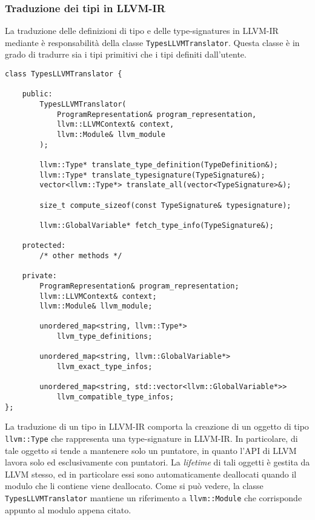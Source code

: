 \subsubsection{Traduzione dei tipi in LLVM-IR}
La traduzione delle definizioni di tipo e delle type-signatures in LLVM-IR mediante è responsabilità della classe 
\texttt{TypesLLVMTranslator}. Questa classe è in grado di tradurre sia i tipi primitivi che i tipi definiti dall'utente.

\vspace{0.5cm}
\begin{lstlisting}[frame=single]
class TypesLLVMTranslator {

    public:
        TypesLLVMTranslator(
            ProgramRepresentation& program_representation, 
            llvm::LLVMContext& context,
            llvm::Module& llvm_module
        );

        llvm::Type* translate_type_definition(TypeDefinition&);
        llvm::Type* translate_typesignature(TypeSignature&);
        vector<llvm::Type*> translate_all(vector<TypeSignature>&);

        size_t compute_sizeof(const TypeSignature& typesignature);

        llvm::GlobalVariable* fetch_type_info(TypeSignature&);

    protected:
        /* other methods */

    private:
        ProgramRepresentation& program_representation;
        llvm::LLVMContext& context;
        llvm::Module& llvm_module;

        unordered_map<string, llvm::Type*> 
            llvm_type_definitions;
        
        unordered_map<string, llvm::GlobalVariable*> 
            llvm_exact_type_infos;

        unordered_map<string, std::vector<llvm::GlobalVariable*>> 
            llvm_compatible_type_infos;
};
\end{lstlisting}
\vspace{0.5cm}

La traduzione di un tipo in LLVM-IR comporta la creazione di un oggetto di tipo \texttt{llvm::Type} che rappresenta
una type-signature in LLVM-IR. In particolare, di tale oggetto si tende a mantenere solo un puntatore, in quanto l'API di 
LLVM lavora solo ed esclusivamente con puntatori. La \textit{lifetime} di tali oggetti è gestita da LLVM stesso, ed in particolare essi sono 
automaticamente deallocati quando il modulo che li contiene viene deallocato. Come si può vedere, la classe \texttt{TypesLLVMTranslator}
mantiene un riferimento a \texttt{llvm::Module} che corrisponde appunto al modulo appena citato. \\ 

